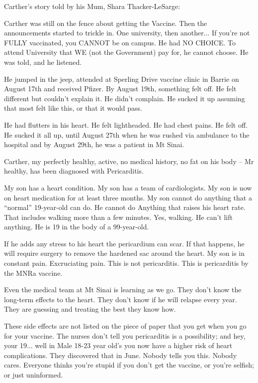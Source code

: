 Carther’s story told by his Mum, Shara Thacker-LeSarge:

Carther was still on the fence about getting the Vaccine. Then the announcements
started to trickle in. One university, then another... If you’re not FULLY
vaccinated, you CANNOT be on campus. He had NO CHOICE. To attend University that
WE (not the Government) pay for, he cannot choose. He was told, and he listened.

He jumped in the jeep, attended at Sperling Drive vaccine clinic in Barrie on
August 17th and received Pfizer. By August 19th, something felt off. He felt
different but couldn’t explain it. He didn’t complain. He sucked it up assuming
that most felt like this, or that it would pass.

He had flutters in his heart. He felt lightheaded. He had chest pains. He felt
off. He sucked it all up, until August 27th when he was rushed via ambulance to
the hospital and by August 29th, he was a patient in Mt Sinai.

Carther, my perfectly healthy, active, no medical history, no fat on his body –
Mr healthy, has been diagnosed with Pericarditis.

My son has a heart condition. My son has a team of cardiologists. My son is now
on heart medication for at least three months. My son cannot do anything that a
``normal'' 19-year-old can do. He cannot do Anything that raises his heart
rate. That includes walking more than a few minutes. Yes, walking. He can’t lift
anything. He is 19 in the body of a 99-year-old.

If he adds any stress to his heart the pericardium can scar. If that happens, he
will require surgery to remove the hardened sac around the heart. My son is in
constant pain. Excruciating pain. This is not pericarditis. This is pericarditis
by the MNRa vaccine.

Even the medical team at Mt Sinai is learning as we go. They don’t know the
long-term effects to the heart. They don’t know if he will relapse every
year. They are guessing and treating the best they know how.

These side effects are not listed on the piece of paper that you get when you go
for your vaccine. The nurses don’t tell you pericarditis is a possibility; and
hey, your 19... well in Male 18-23 year old’s you now have a higher risk of
heart complications. They discovered that in June. Nobody tells you this. Nobody
cares. Everyone thinks you’re stupid if you don’t get the vaccine, or you’re
selfish; or just uninformed.


